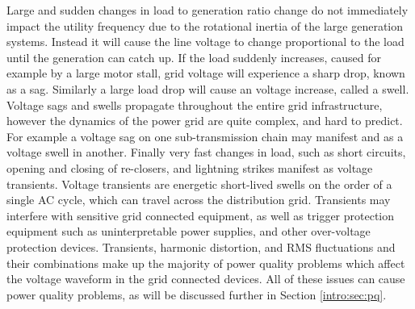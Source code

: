 Large and sudden changes in load to generation ratio change do not immediately impact the utility frequency due to the rotational inertia of the large generation systems. Instead it will cause the line voltage to change proportional to the load until the generation can catch up. If the load suddenly increases, caused for example by a large motor stall, grid voltage will experience a sharp drop, known as a sag. Similarly a large load drop will cause an voltage increase, called a swell. Voltage sags and swells propagate throughout the entire grid infrastructure, however the dynamics of the power grid are quite complex, and hard to predict. For example a voltage sag on one sub-transmission chain may manifest and as a voltage swell in another. Finally very fast changes in load, such as short circuits, opening and closing of re-closers, and lightning strikes manifest as voltage transients. Voltage transients are energetic short-lived swells on the order of a single AC cycle, which can travel across the distribution grid. Transients may interfere with sensitive grid connected equipment, as well as trigger protection equipment such as uninterpretable power supplies, and other over-voltage protection devices. Transients, harmonic distortion, and RMS fluctuations and their combinations make up the majority of power quality problems which affect the voltage waveform in the grid connected devices. \cite{5154067} All of these issues can cause power quality problems, as will be discussed further in Section \ref{intro:sec:pq}.

